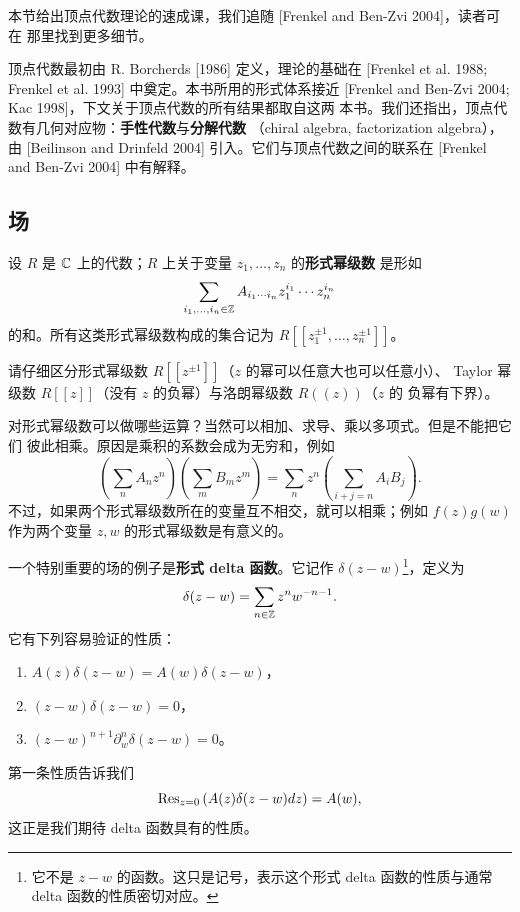 本节给出顶点代数理论的速成课，我们追随 [Frenkel and Ben-Zvi 2004]，读者可在
那里找到更多细节。

顶点代数最初由 R. Borcherds [1986] 定义，理论的基础在
[Frenkel et al. 1988; Frenkel et al. 1993] 中奠定。本书所用的形式体系接近
[Frenkel and Ben-Zvi 2004; Kac 1998]，下文关于顶点代数的所有结果都取自这两
本书。我们还指出，顶点代数有几何对应物：\textbf{手性代数}与\textbf{分解代数}
（chiral algebra, factorization algebra），由 [Beilinson and Drinfeld 2004]
引入。它们与顶点代数之间的联系在 [Frenkel and Ben-Zvi 2004] 中有解释。

\subsection{场}

设 $R$ 是 $\mathbb{C}$ 上的代数；$R$ 上关于变量 $z_1,\dots,z_n$ 的\textbf{形式幂级数}
是形如
\[
    \sum_{i_1,\dots,i_n\in\mathbb{Z}}A_{i_1\cdots i_n}z_1^{i_1}\cdots z_n^{i_n}
\]
的和。所有这类形式幂级数构成的集合记为 $R[[z_1^{\pm1},\dots,z_n^{\pm1}]]$。

请仔细区分形式幂级数 $R[[z^{\pm1}]]$（$z$ 的幂可以任意大也可以任意小）、
Taylor 幂级数 $R[[z]]$（没有 $z$ 的负幂）与洛朗幂级数 $R(\!(z)\!)$（$z$ 的
负幂有下界）。

对形式幂级数可以做哪些运算？当然可以相加、求导、乘以多项式。但是不能把它们
彼此相乘。原因是乘积的系数会成为无穷和，例如
\[
    \left(\sum_nA_nz^n\right)\left(\sum_mB_mz^m\right)
    =\sum_nz^n\left(\sum_{i+j=n}A_iB_j\right).
\]
不过，如果两个形式幂级数所在的变量互不相交，就可以相乘；例如 $f(z)g(w)$
作为两个变量 $z,w$ 的形式幂级数是有意义的。

一个特别重要的场的例子是\textbf{形式 delta 函数}。它记作 $\delta(z-w)$\footnote{%
它不是 $z-w$ 的函数。这只是记号，表示这个形式 delta 函数的性质与通常
delta 函数的性质密切对应。}，定义为
\[
    \delta(z-w)=\sum_{n\in\mathbb{Z}}z^nw^{-n-1}.
\]
它有下列容易验证的性质：
\begin{enumerate}[label=(\arabic*)]
    \item $A(z)\delta(z-w)=A(w)\delta(z-w)$，
    \item $(z-w)\delta(z-w)=0$，
    \item $(z-w)^{n+1}\partial_w^n\delta(z-w)=0$。
\end{enumerate}
第一条性质告诉我们
\[
    \operatorname{Res}_{z=0}\left(A(z)\delta(z-w)dz\right)=A(w),
\]
这正是我们期待 delta 函数具有的性质。

